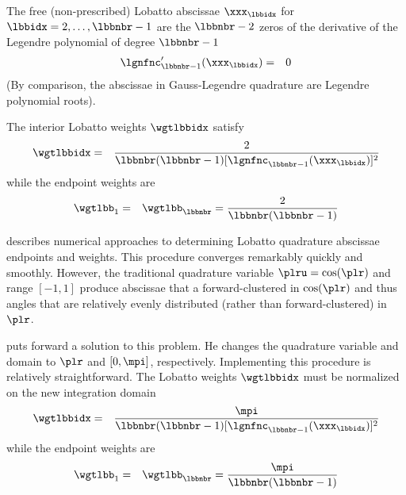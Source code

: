 \documentclass[12pt]{article}
\begin{document}
The free (non-prescribed) Lobatto abscissae $\xxx_{\lbbidx}$ for
$\lbbidx = 2,\ldots,\lbbnbr-1$ are the $\lbbnbr-2$ zeros of the
derivative of the Legendre polynomial of degree $\lbbnbr-1$ 
\begin{eqnarray}
\label{eqn:qdr_lbb_abc_dfn}
\lgnfnc_{\lbbnbr-1}^{\prime}(\xxx_{\lbbidx}) & = & 0
\end{eqnarray}
(By comparison, the abscissae in Gauss-Legendre quadrature 
are Legendre polynomial roots).

The interior Lobatto weights $\wgtlbbidx$ satisfy
\begin{eqnarray}
\label{eqn:qdr_lbb_wgt_dfn}
\wgtlbbidx & = & \frac{2}
{\lbbnbr(\lbbnbr-1)[\lgnfnc_{\lbbnbr-1}(\xxx_{\lbbidx})]^{2}}
\end{eqnarray}
while the endpoint weights are
\begin{eqnarray}
\label{eqn:qdr_lbb_wgt_end_dfn}
\wgtlbb_{1} & = & \wgtlbb_{\lbbnbr} =  
\frac{2}{\lbbnbr(\lbbnbr-1)}
\end{eqnarray}

\citet{Mic63} describes numerical approaches to determining Lobatto
quadrature abscissae endpoints and weights.
This procedure converges remarkably quickly and smoothly.
However, the traditional quadrature variable $\plru = \cos(\plr)$
and range $[-1,1]$ produce abscissae that a forward-clustered 
in $\cos(\plr)$ and thus angles that are relatively evenly distributed
(rather than forward-clustered) in~$\plr$.

\citet{Wis771} puts forward a solution to this problem.
He changes the quadrature variable and domain to $\plr$ and
$[0,\mpi]$, respectively.
Implementing this procedure is relatively straightforward.
The Lobatto weights $\wgtlbbidx$ must be normalized on the new 
integration domain
\begin{eqnarray}
\label{eqn:qdr_lbb_mdf_wgt_dfn}
\wgtlbbidx & = & \frac{\mpi}
{\lbbnbr(\lbbnbr-1)[\lgnfnc_{\lbbnbr-1}(\xxx_{\lbbidx})]^{2}}
\end{eqnarray}
while the endpoint weights are
\begin{eqnarray}
\label{eqn:qdr_lbb_mdf_wgt_end_dfn}
\wgtlbb_{1} & = & \wgtlbb_{\lbbnbr} =  
\frac{\mpi}{\lbbnbr(\lbbnbr-1)}
\end{eqnarray}
\end{document}
